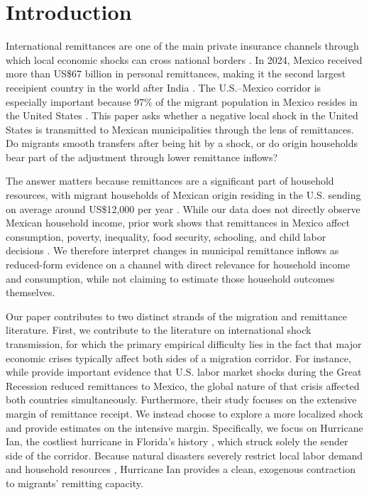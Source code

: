 \chapter{Introduction}

International remittances are one of the main private insurance channels through which local economic shocks can cross national borders \parencite{yang_choi_2007, bettin_2023, dorantes_pozo_2006}. In 2024, Mexico received more than US\$67 billion in personal remittances, making it the second largest receipient country in the world after India \parencite{banxico_remittances_ca11, worldbank_remittances}. The U.S.--Mexico corridor is especially important because 97\% of the migrant population in Mexico resides in the United States \parencite{LiNg2024}. This paper asks whether a negative local shock in the United States is transmitted to Mexican municipalities through the lens of remittances. Do migrants smooth transfers after being hit by a shock, or do origin households bear part of the adjustment through lower remittance inflows?
\par
The answer matters because remittances are a significant part of household resources, with migrant households of Mexican origin residing in the U.S. sending on average around US\$12,000 per year \parencite{isidro_martinez_2025}. While our data does not directly observe Mexican household income, prior work shows that remittances in Mexico affect consumption, poverty, inequality, food security, schooling, and child labor decisions \parencite{adamsetal2005,MORARIVERA2021105349, ALCARAZ2012156}. We therefore interpret changes in municipal remittance inflows as reduced-form evidence on a channel with direct relevance for household income and consumption, while not claiming to estimate those household outcomes themselves.
\par
Our paper contributes to two distinct strands of the migration and remittance literature. First, we contribute to the literature on international shock transmission, for which the primary empirical difficulty lies in the fact that major economic crises typically affect both sides of a migration corridor. For instance, while \textcite{caballero_2023} provide important evidence that U.S. labor market shocks during the Great Recession reduced remittances to Mexico, the global nature of that crisis affected both countries simultaneously. Furthermore, their study focuses on the extensive margin of remittance receipt. We instead choose to explore a more localized shock and provide estimates on the intensive margin. Specifically, we focus on Hurricane Ian, the costliest hurricane in Florida's history \parencite{nhc_ian_2026}, which struck solely the sender side of the corridor. Because natural disasters severely restrict local labor demand and household resources \parencite{natural_disasters_US}, Hurricane Ian provides a clean, exogenous contraction to migrants' remitting capacity.
